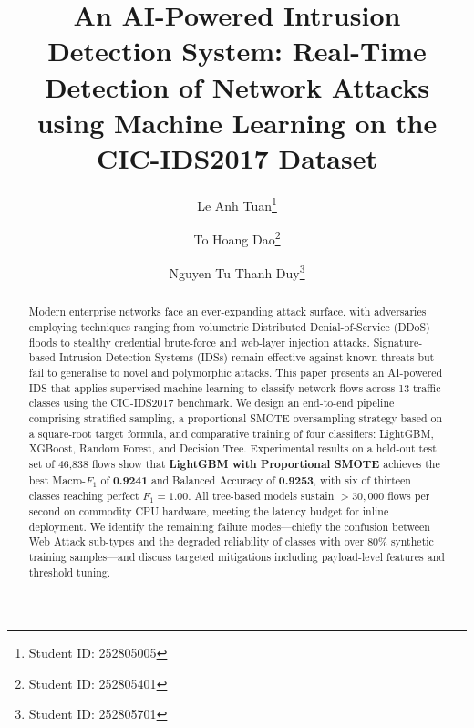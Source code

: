 \documentclass[runningheads]{llncs}
\begin{document}
\title{An AI-Powered Intrusion Detection System: Real-Time Detection of Network Attacks using Machine Learning on the CIC-IDS2017 Dataset}


\author{Le Anh Tuan\thanks{Student ID: 252805005} \and
        To Hoang Dao\thanks{Student ID: 252805401} \and
        Nguyen Tu Thanh Duy\thanks{Student ID: 252805701}}


\maketitle

\begin{abstract}
Modern enterprise networks face an ever-expanding attack surface, with adversaries employing techniques ranging from volumetric Distributed Denial-of-Service (DDoS) floods to stealthy credential brute-force and web-layer injection attacks. Signature-based Intrusion Detection Systems (IDSs) remain effective against known threats but fail to generalise to novel and polymorphic attacks. This paper presents an AI-powered IDS that applies supervised machine learning to classify network flows across 13 traffic classes using the CIC-IDS2017 benchmark. We design an end-to-end pipeline comprising stratified sampling, a proportional SMOTE oversampling strategy based on a square-root target formula, and comparative training of four classifiers: LightGBM, XGBoost, Random Forest, and Decision Tree. Experimental results on a held-out test set of 46,838 flows show that \textbf{LightGBM with Proportional SMOTE} achieves the best Macro-$F_1$ of \textbf{0.9241} and Balanced Accuracy of \textbf{0.9253}, with six of thirteen classes reaching perfect $F_1 = 1.00$. All tree-based models sustain $> 30{,}000$ flows per second on commodity CPU hardware, meeting the latency budget for inline deployment. We identify the remaining failure modes---chiefly the confusion between Web Attack sub-types and the degraded reliability of classes with over 80\% synthetic training samples---and discuss targeted mitigations including payload-level features and threshold tuning.

\end{abstract}
\end{document}
